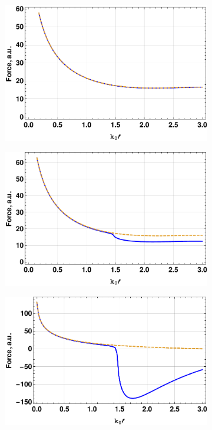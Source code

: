 \begin{figure}
    \centering
    \begin{subfigure}[t]{0.45\textwidth}
        \includegraphics[width=\textwidth]{figures/Force100_001.pdf}
        \caption{}  
        \end{subfigure}
    \begin{subfigure}[t]{0.45\textwidth}
        \includegraphics[width=\textwidth]{figures/Force100_01.pdf}
        \caption{}  
    \end{subfigure}
    \begin{subfigure}[t]{0.6\textwidth}
        \includegraphics[width=\textwidth]{figures/Force100_1.pdf}

\end{subfigure}
\end{figure}
